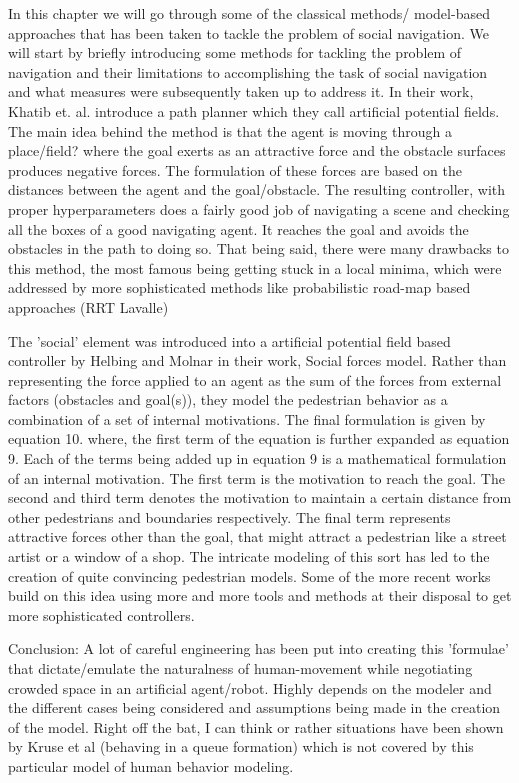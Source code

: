 In this chapter we will go through some of the classical methods/ model-based approaches that has been taken to tackle the problem of social navigation. We will start by briefly introducing some methods for tackling the problem of navigation and their limitations to accomplishing the task of social navigation and what measures were subsequently taken up to address it.
In their work, Khatib et. al. introduce a path planner which they call artificial potential fields. The main idea behind the method is that the agent is moving through a place/field? where the goal exerts as an attractive force and the obstacle surfaces produces negative forces. The formulation of these forces are based on the distances between the agent and the goal/obstacle. The resulting controller, with proper hyperparameters does a fairly good job of navigating a scene and checking all the boxes of a good navigating agent. It reaches the goal and avoids the obstacles in the path to doing so. That being said, there were many drawbacks to this method, the most famous being getting stuck in a local minima, which were addressed by more sophisticated methods like probabilistic road-map based approaches (RRT Lavalle)

The 'social' element was introduced into a artificial potential field based controller by Helbing and Molnar in their work, Social forces model.
Rather than representing the force applied to an agent as the sum of the forces from external factors (obstacles and goal(s)), they model the pedestrian behavior as a combination of a set of internal motivations. 
The final formulation is given by equation 10.
where, the first term of the equation is further expanded as equation 9.
Each of the terms being added up in equation 9 is a mathematical formulation of an internal motivation.
The first term is the motivation to reach the goal.
The second and third term denotes the motivation to maintain a certain distance from other pedestrians and boundaries respectively.
The final term represents attractive forces other than the goal, that might attract a pedestrian like a street artist or a window of a shop.
The intricate modeling of this sort has led to the creation of quite convincing pedestrian models. 
Some of the more recent works build on this idea using more and more tools and methods at their disposal to get more sophisticated controllers.


Conclusion:
A lot of careful engineering has been put into creating this 'formulae' that dictate/emulate the naturalness of human-movement while negotiating crowded space in an artificial agent/robot. 
Highly depends on the modeler and the different cases being considered and assumptions being made in the creation of the model. 
Right off the bat, I can think or rather situations have been shown by Kruse et al (behaving in a queue formation) which is not covered by this particular model of human behavior modeling.

